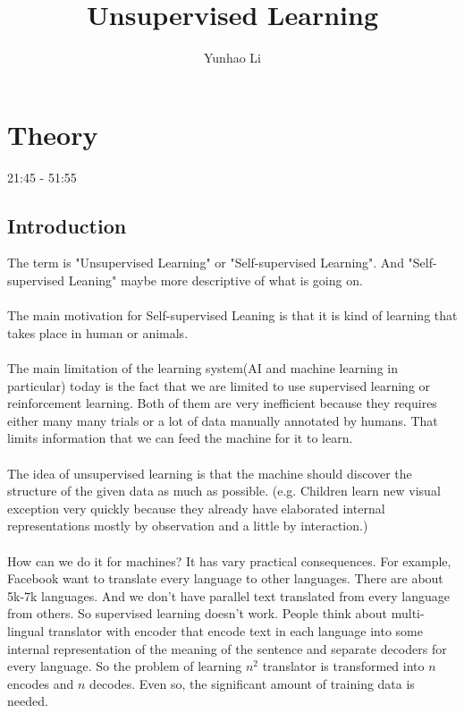 \documentclass{article}
\title{Unsupervised Learning}
\author{Yunhao Li}
\begin{document}
\maketitle

\section{Theory}
21:45 - 51:55
\subsection{Introduction}

The term is "Unsupervised Learning" or "Self-supervised Learning". And "Self-supervised Leaning" maybe more descriptive of what is going on. \\ \\

The main motivation for Self-supervised Leaning is that it is kind of learning that takes place in human or animals. \\ \\

The main limitation of the learning system(AI and machine learning in particular) today is the fact that we are limited to use supervised learning or reinforcement learning. Both of them are very inefficient because they requires either many many trials or a lot of data manually annotated by humans. That limits information that we can feed the machine for it to learn. \\ \\

The idea of unsupervised learning is that the machine should discover the structure of the given data as much as possible. (e.g. Children learn new visual exception very quickly because they already have elaborated internal representations mostly by observation and a little by interaction.) \\ \\

How can we do it for machines? It has vary practical consequences. For example, Facebook want to translate every language to other languages. There are about 5k-7k languages. And we don't have parallel text translated from every language from others. So supervised learning doesn't work. People think about multi-lingual translator with encoder that encode text in each language into some internal representation of the meaning of the sentence and separate decoders for every language. So the problem of learning $n^2$ translator is transformed into $n$ encodes and $n$ decodes. Even so, the significant amount of training data is needed. \\ \\    
\end{document}
